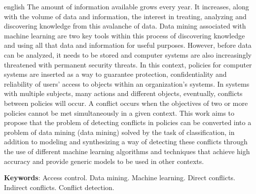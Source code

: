 \documentclass[
	12pt,				%
	openright,			%
	twoside,			%
	a4paper,			%
	english,			%
	french,				%
	spanish,			%
	brazil				%
	]{abntex2}
\begin{document}
\begin{resumo}[Abstract]
 \begin{otherlanguage*}{english}
   The amount of information available grows every year. It increases, along with the volume of data and information, the interest in treating, analyzing and discovering knowledge from this avalanche of data. Data mining associated with machine learning are two key tools within this process of discovering knowledge and using all that data and information for useful purposes. However, before data can be analyzed, it needs to be stored and computer systems are also increasingly threatened with permanent security threats. In this context, policies for computer systems are inserted as a way to guarantee protection, confidentiality and reliability of users' access to objects within an organization's systems. In systems with multiple subjects, many actions and different objects, eventually, conflicts between policies will occur. A conflict occurs when the objectives of two or more policies cannot be met simultaneously in a given context. This work aims to propose that the problem of detecting conflicts in policies can be converted into a problem of data mining (data mining) solved by the task of classification, in addition to modeling and synthesizing a way of detecting these conflicts through the use of different machine learning algorithms and techniques that achieve high accuracy and provide generic models to be used in other contexts.

   \vspace{\onelineskip}
 
   \noindent 
   \textbf{Keywords}: Access control. Data mining. Machine learning. Direct conflicts. Indirect conflicts. Conflict detection.
 \end{otherlanguage*}
\end{resumo}

\listoffigures*
\cleardoublepage


\listoftables*
\end{document}
